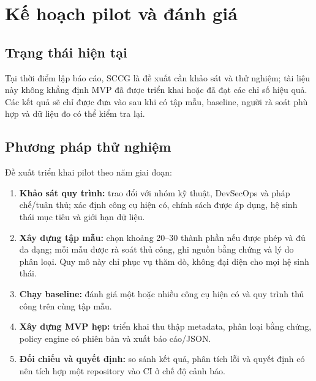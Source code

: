 \chapter{Kế hoạch pilot và đánh giá}

\section{Trạng thái hiện tại}
Tại thời điểm lập báo cáo, SCCG là đề xuất cần khảo sát và thử nghiệm; tài liệu này không khẳng định MVP đã được triển khai hoặc đã đạt các chỉ số hiệu quả. Các kết quả sẽ chỉ được đưa vào sau khi có tập mẫu, baseline, người rà soát phù hợp và dữ liệu đo có thể kiểm tra lại.

\section{Phương pháp thử nghiệm}
Đề xuất triển khai pilot theo năm giai đoạn:
\begin{enumerate}[label=\arabic*.]
    \item \textbf{Khảo sát quy trình:} trao đổi với nhóm kỹ thuật, DevSecOps và pháp chế/tuân thủ; xác định công cụ hiện có, chính sách được áp dụng, hệ sinh thái mục tiêu và giới hạn dữ liệu.
    \item \textbf{Xây dựng tập mẫu:} chọn khoảng 20--30 thành phần nếu được phép và đủ đa dạng; mỗi mẫu được rà soát thủ công, ghi nguồn bằng chứng và lý do phân loại. Quy mô này chỉ phục vụ thăm dò, không đại diện cho mọi hệ sinh thái.
    \item \textbf{Chạy baseline:} đánh giá một hoặc nhiều công cụ hiện có và quy trình thủ công trên cùng tập mẫu.
    \item \textbf{Xây dựng MVP hẹp:} triển khai thu thập metadata, phân loại bằng chứng, policy engine có phiên bản và xuất báo cáo/JSON.
    \item \textbf{Đối chiếu và quyết định:} so sánh kết quả, phân tích lỗi và quyết định có nên tích hợp một repository vào CI ở chế độ cảnh báo.
\end{enumerate}

